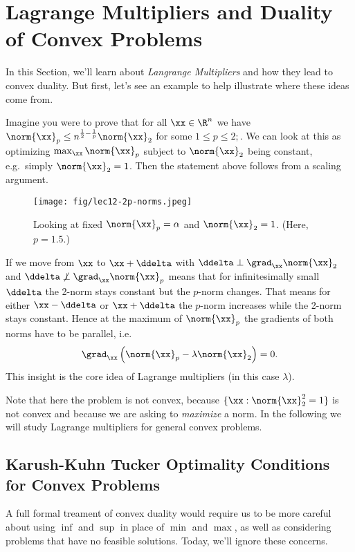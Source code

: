 \section{Lagrange Multipliers and Duality of Convex Problems}

In this Section, we'll learn about \emph{Langrange Multipliers} and
how they lead to convex duality.
But first, let's see an example to help illustrate where these ideas
come from.

Imagine you were to prove that for all $\xx \in \R^n$ we have $\norm{\xx}_p \leq n^{\frac{1}{2} - \frac{1}{p}}\norm{\xx}_2$ for some $1 \leq p \leq 2;$.
We can look at this as optimizing $\max_{\xx} \norm{\xx}_p$ subject to $\norm{\xx}_2$ being constant, e.g.\ simply $\norm{\xx}_2 = 1$. Then the statement above follows from a scaling argument.

\begin{figure}[ht]
  \centering
  \texttt{[image: fig/lec12-2p-norms.jpeg]}
  \caption{Looking at fixed $\norm{\xx}_p = \alpha$ and $\norm{\xx}_2=1$. (Here, $p = 1.5$.)}
  \label{fig:2-p-norm}
\end{figure}

If we move from $\xx$ to $\xx + \ddelta$ with $\ddelta \perp \grad_{\xx}\norm{\xx}_2$ and $\ddelta \not\perp \grad_{\xx}\norm{\xx}_p$ means that for infinitesimally small $\ddelta$ the 2-norm stays constant but the $p$-norm changes.
That means for either $\xx - \ddelta$ or $\xx + \ddelta$ the $p$-norm increases
while the 2-norm stays constant. Hence at the maximum of $\norm{\xx}_p$ the gradients of both norms have to be parallel, i.e.~\begin{equation*}\grad_{\xx}\left(\norm{\xx}_p - \lambda\norm{\xx}_2\right) = 0.\end{equation*}
This insight is the core idea of Lagrange multipliers (in this case $\lambda$).

Note that here the problem is not convex, because $\{ \xx: \norm{\xx}_2^2 =
1 \}$ is not convex and because we are asking to \emph{maximize} a norm.
In the following we will study Lagrange multipliers for general convex
problems.

\subsection{Karush-Kuhn Tucker Optimality Conditions for Convex Problems}

A full formal treament of convex duality would require us to be more careful
about using $\inf$ and $\sup$ in place of $\min$ and $\max$, as well
as considering problems that have no feasible solutions.
Today, we'll ignore these concerns.

